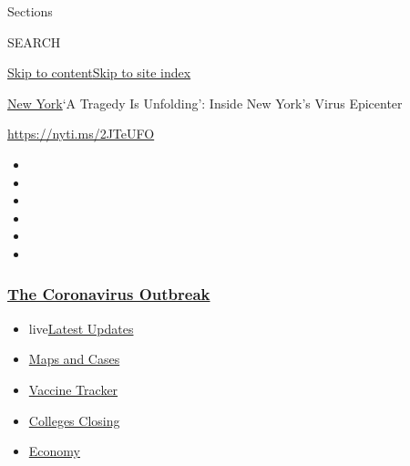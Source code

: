 Sections

SEARCH

\protect\hyperlink{site-content}{Skip to
content}\protect\hyperlink{site-index}{Skip to site index}

\href{/section/nyregion}{New York}\textbar{}`A Tragedy Is Unfolding':
Inside New York's Virus Epicenter

\url{https://nyti.ms/2JTeUFO}

\begin{itemize}
\item
\item
\item
\item
\item
\item
\end{itemize}

\hypertarget{the-coronavirus-outbreak}{%
\subsubsection{\texorpdfstring{\href{https://www.nytimes3xbfgragh.onion/news-event/coronavirus?name=styln-coronavirus-national\&region=TOP_BANNER\&variant=undefined\&block=storyline_menu_recirc\&action=click\&pgtype=Article\&impression_id=28e06040-e39f-11ea-8161-e7709b4b19cf}{The
Coronavirus
Outbreak}}{The Coronavirus Outbreak}}\label{the-coronavirus-outbreak}}

\begin{itemize}
\tightlist
\item
  live\href{https://www.nytimes3xbfgragh.onion/2020/08/21/world/covid-19-coronavirus.html?name=styln-coronavirus-national\&region=TOP_BANNER\&variant=undefined\&block=storyline_menu_recirc\&action=click\&pgtype=Article\&impression_id=28e08750-e39f-11ea-8161-e7709b4b19cf}{Latest
  Updates}
\item
  \href{https://www.nytimes3xbfgragh.onion/interactive/2020/us/coronavirus-us-cases.html?name=styln-coronavirus-national\&region=TOP_BANNER\&variant=undefined\&block=storyline_menu_recirc\&action=click\&pgtype=Article\&impression_id=28e08751-e39f-11ea-8161-e7709b4b19cf}{Maps
  and Cases}
\item
  \href{https://www.nytimes3xbfgragh.onion/interactive/2020/science/coronavirus-vaccine-tracker.html?name=styln-coronavirus-national\&region=TOP_BANNER\&variant=undefined\&block=storyline_menu_recirc\&action=click\&pgtype=Article\&impression_id=28e08752-e39f-11ea-8161-e7709b4b19cf}{Vaccine
  Tracker}
\item
  \href{https://www.nytimes3xbfgragh.onion/2020/08/19/us/colleges-closing-covid.html?name=styln-coronavirus-national\&region=TOP_BANNER\&variant=undefined\&block=storyline_menu_recirc\&action=click\&pgtype=Article\&impression_id=28e08753-e39f-11ea-8161-e7709b4b19cf}{Colleges
  Closing}
\item
  \href{https://www.nytimes3xbfgragh.onion/live/2020/08/20/business/stock-market-today-coronavirus?name=styln-coronavirus-national\&region=TOP_BANNER\&variant=undefined\&block=storyline_menu_recirc\&action=click\&pgtype=Article\&impression_id=28e0ae60-e39f-11ea-8161-e7709b4b19cf}{Economy}
\end{itemize}

